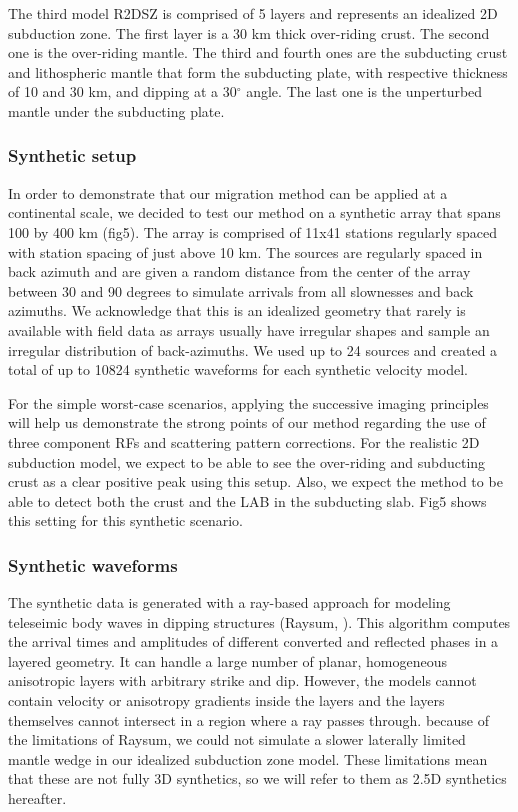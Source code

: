 \documentclass[10pt,a4paper]{article}
\numberwithin{equation}{section}
\begin{document}
The third model R2DSZ is comprised of 5 layers and represents an idealized 2D subduction zone.
The first layer is a 30 km thick over-riding crust.
The second one is the over-riding mantle.
The third and fourth ones are the subducting crust and lithospheric mantle that form the subducting plate, with respective thickness of 10 and 30 km,  and dipping at a 30$^{\circ}$ angle.
The last one is the unperturbed mantle under the subducting plate.

\subsubsection{Synthetic setup}

In order to demonstrate that our migration method can be applied at a continental scale, we decided to test our method on a synthetic array that spans 100 by 400 km (fig5).
The array is comprised of 11x41 stations regularly spaced with station spacing of just above 10 km.
The sources are regularly spaced in back azimuth and are given a random distance from the center of the array between 30 and 90 degrees to simulate arrivals from all slownesses and back azimuths.
We acknowledge that this is an idealized geometry that rarely is available with field data as arrays usually have irregular shapes and sample an irregular distribution of back-azimuths.
We used up to 24 sources and created a total of up to 10824 synthetic waveforms for each synthetic velocity model.

For the simple worst-case scenarios, applying the successive imaging principles will help us demonstrate the strong points of our method regarding the use of three component RFs and scattering pattern corrections.
For the realistic 2D subduction model, we expect to be able to see the over-riding and subducting crust as a clear positive peak using this setup.
Also, we expect the method to be able to detect both the crust and the LAB in the subducting slab.
Fig5 shows this setting for this synthetic scenario.

\subsubsection{Synthetic waveforms}

The synthetic data is generated with a ray-based approach for modeling teleseimic body waves in dipping structures (Raysum, \cite{fred_gji_00}).
This algorithm computes the arrival times and amplitudes of different converted and reflected phases in a layered geometry.
It can handle a large number of planar, homogeneous anisotropic layers with arbitrary strike and dip.
However, the models cannot contain velocity or anisotropy gradients inside the layers and the layers themselves cannot intersect in a region where a ray passes through.
because of the limitations of Raysum, we could not simulate a slower laterally limited mantle wedge in our idealized subduction zone model.
These limitations mean that these are not fully 3D synthetics, so we will refer to them as 2.5D synthetics hereafter.
\end{document}
